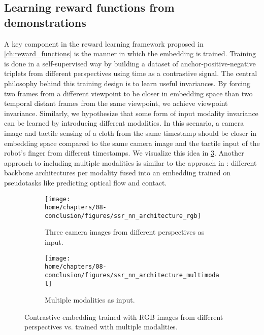 \documentclass[\home/main.tex]{subfiles}
\begin{document}
\subsection{Learning reward functions from demonstrations} \label{subsec:conc_future_tcn}
A key component in the reward learning framework proposed in \cref{ch:reward_functions} is the manner in which the embedding is trained. Training is done in a self-supervised way by building a dataset of anchor-positive-negative triplets from different perspectives using time as a contrastive signal. The central philosophy behind this training design is to learn useful invariances. By forcing two frames from a different viewpoint to be closer in embedding space than two temporal distant frames from the same viewpoint, we achieve viewpoint invariance. Similarly, we hypothesize that some form of input modality invariance can be learned by introducing different modalities. In this scenario, a camera image and tactile sensing of a cloth from the same timestamp should be closer in embedding space compared to the same camera image and the tactile input of the robot's finger from different timestamps. We visualize this idea in \cref{fig:conc_multimodal_tcn}. %
Another approach to including multiple modalities is similar to the approach in \autocite{Lee2019}: different backbone architectures per modality fused into an embedding trained on pseudotasks like predicting optical flow and contact.

\begin{figure}[htpb]{}
    \centering
    \begin{subfigure}[b]{0.90\textwidth}
        \centering
        \texttt{[image: \\home/chapters/08-conclusion/figures/ssr\_nn\_architecture\_rgb]}
        \caption{Three camera images from different perspectives as input.}
        \label{fig:conc_tcn_rgb}
    \end{subfigure}
    \par\bigskip %
    \par\bigskip %
    \begin{subfigure}[b]{0.90\textwidth}
        \centering
        \texttt{[image: \\home/chapters/08-conclusion/figures/ssr\_nn\_architecture\_multimodal]}
        \caption{Multiple modalities as input.}
        \label{fig:conc_tcn_multimodal}
    \end{subfigure}

    \caption[Multimodal contrastive embedding.]{Contrastive embedding trained with RGB images from different perspectives vs. trained with multiple modalities.}
    \label{fig:conc_multimodal_tcn}
\end{figure}
\end{document}
